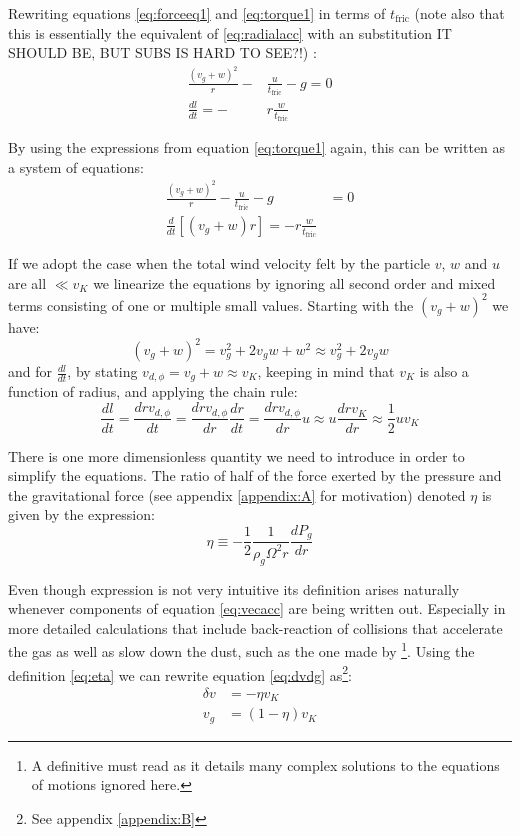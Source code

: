 \documentclass[12pt]{article}
\begin{document}
Rewriting equations \ref{eq:forceeq1} and \ref{eq:torque1} in terms of $t_{\mathrm{fric}}$ (note also that this is essentially the equivalent of \ref{eq:radialacc} with an substitution IT SHOULD BE, BUT SUBS IS HARD TO SEE?!) :
\begin{align}
    \label{eq:}
    \frac{(v_g+w)^2}{r} -& \frac{u}{t_{\mathrm{fric}}} - g = 0 \\
    \frac{dl}{dt} = -&r\frac{w}{t_{\mathrm{fric}}}
\end{align}

By using the expressions from equation \ref{eq:torque1} again, this can be written as a system of equations:
\begin{align}
    \label{eq:forceeq2}
    \frac{(v_g+w)^2}{r} - \frac{u}{t_{\mathrm{fric}}} - g &= 0 \\
    \label{eq:torque2}
    \frac{d}{dt}\left[(v_g+w)r\right] = -r\frac{w}{t_{\mathrm{fric}}}&
\end{align}

If we adopt the case when the total wind velocity felt by the particle $v$, $w$ and $u$ are all $\ll v_K$ we linearize the equations by ignoring all second order and mixed terms consisting of one or multiple small values. Starting with the $(v_g+w)^2$ we have:
$$ (v_g+w)^2 = v_g^2 + 2v_gw + w^2 \approx v_g^2 + 2v_gw $$
and for $\frac{dl}{dt}$, by stating $v_{d, \phi}=v_g+w \approx v_K$, keeping in mind that $v_K$ is also a function of radius, and applying the chain rule:
$$\frac{dl}{dt} = \frac{drv_{d, \phi}}{dt} = \frac{drv_{d, \phi}}{dr}\frac{dr}{dt} = \frac{drv_{d, \phi}}{dr}u \approx u\frac{drv_K}{dr} \approx \frac{1}{2}uv_K$$ 

There is one more dimensionless quantity we need to introduce in order to simplify the equations. The ratio of half of the force exerted by the pressure and the gravitational force (see appendix \ref{appendix:A} for motivation) denoted $\eta$ is given by the expression: 
\begin{equation}
   \label{eq:eta}
    \eta \equiv -\frac{1}{2} \frac{1}{\rho_g \Omega^2 r } \frac{dP_g}{dr}
\end{equation}

Even though expression is not very intuitive its definition arises naturally whenever components of equation \ref{eq:vecacc} are being written out. Especially in more detailed calculations that include back-reaction of collisions that accelerate the gas as well as slow down the dust, such as the one made by \citet{Nakagawa86}\footnote{A definitive must read as it details many complex solutions to the equations of motions ignored here.}. Using the definition \ref{eq:eta} we can rewrite equation \ref{eq:dvdg} as\footnote{See appendix \ref{appendix:B}}: 
\begin{align}
    \delta v &= - \eta v_K \\
    v_g &= (1-\eta)v_K
\end{align}
\end{document}
